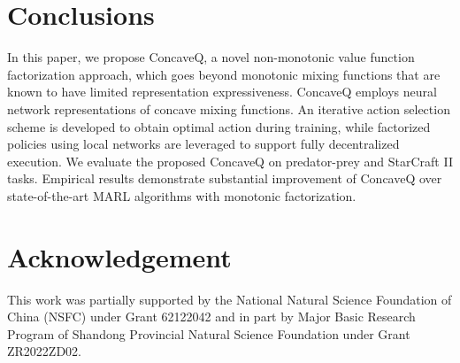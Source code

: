 \section{Conclusions}
In this paper, we propose ConcaveQ, a novel non-monotonic value function factorization approach, which goes beyond monotonic mixing functions that are known to have limited representation expressiveness. ConcaveQ employs neural network representations of concave mixing functions. 
An iterative action selection scheme is developed to obtain optimal action during training, while factorized policies using local networks are leveraged to support fully decentralized execution. 
We evaluate the proposed ConcaveQ on predator-prey and StarCraft II tasks. Empirical results demonstrate substantial improvement of ConcaveQ over state-of-the-art MARL algorithms with monotonic factorization.


\clearpage
\section{Acknowledgement}
This work was partially supported by the National Natural Science Foundation
of China (NSFC) under Grant 62122042 and in part by Major Basic Research Program of
Shandong Provincial Natural Science Foundation under Grant ZR2022ZD02.
